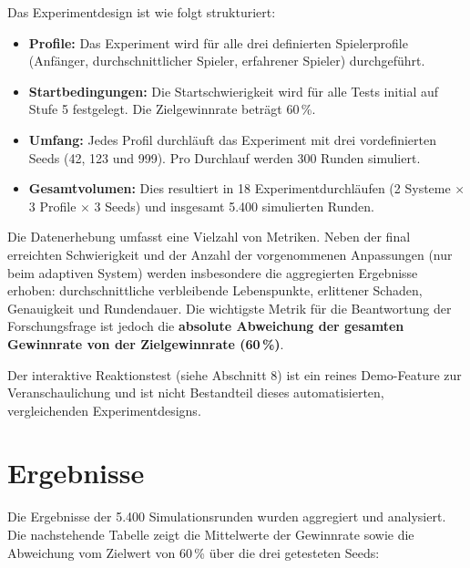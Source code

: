 \documentclass[11pt,a4paper]{article}
\begin{document}
Das Experimentdesign ist wie folgt strukturiert:
\begin{itemize}
    \item \textbf{Profile:} Das Experiment wird für alle drei definierten Spielerprofile (Anfänger, durchschnittlicher Spieler, erfahrener Spieler) durchgeführt.
    \item \textbf{Startbedingungen:} Die Startschwierigkeit wird für alle Tests initial auf Stufe 5 festgelegt. Die Zielgewinnrate beträgt 60\,\%.
    \item \textbf{Umfang:} Jedes Profil durchläuft das Experiment mit drei vordefinierten Seeds (42, 123 und 999). Pro Durchlauf werden 300 Runden simuliert.
    \item \textbf{Gesamtvolumen:} Dies resultiert in 18 Experimentdurchläufen (2 Systeme $\times$ 3 Profile $\times$ 3 Seeds) und insgesamt 5.400 simulierten Runden.
\end{itemize}

Die Datenerhebung umfasst eine Vielzahl von Metriken. Neben der final erreichten Schwierigkeit und der Anzahl der vorgenommenen Anpassungen (nur beim adaptiven System) werden insbesondere die aggregierten Ergebnisse erhoben: durchschnittliche verbleibende Lebenspunkte, erlittener Schaden, Genauigkeit und Rundendauer. Die wichtigste Metrik für die Beantwortung der Forschungsfrage ist jedoch die \textbf{absolute Abweichung der gesamten Gewinnrate von der Zielgewinnrate (60\,\%)}.

Der interaktive Reaktionstest (siehe Abschnitt 8) ist ein reines Demo-Feature zur Veranschaulichung und ist nicht Bestandteil dieses automatisierten, vergleichenden Experimentdesigns.

\section{Ergebnisse}

Die Ergebnisse der 5.400 Simulationsrunden wurden aggregiert und analysiert. Die nachstehende Tabelle zeigt die Mittelwerte der Gewinnrate sowie die Abweichung vom Zielwert von 60\,\% über die drei getesteten Seeds:

\begin{table}[H]
    \centering
    \caption{Mittlere Ergebnisse der Vergleichsexperimente über drei Seeds}
\end{table}
\end{document}
